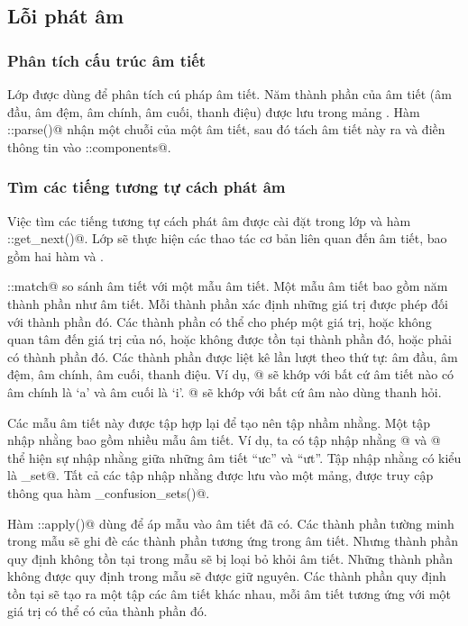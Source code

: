 \documentclass[a4paper,oneside,14pt]{extbook} %
\begin{document}
\subsection{Lỗi phát âm}
\label{sec:impl:phonetic-error}
\subsubsection{Phân tích cấu trúc âm tiết}

Lớp \verb@Syllable@ được dùng để phân tích cú pháp âm tiết. Năm thành
phần của âm tiết (âm đầu, âm đệm, âm chính, âm cuối, thanh điệu) được
lưu trong mảng \verb@components@. Hàm \verb@Syllable::parse()@ nhận
một chuỗi của một âm tiết, sau đó tách âm tiết này ra và điền thông
tin vào \verb@Syllable::components@.

\subsubsection{Tìm các tiếng tương tự cách phát âm}

Việc tìm các tiếng tương tự cách phát âm được cài đặt trong lớp
\verb@Syllable@ và hàm
\verb@FuzzyWordState::get_next()@. Lớp
\verb@Syllable@ sẽ thực hiện các thao tác cơ bản liên quan đến âm
tiết, bao gồm hai hàm \verb@match@ và \verb@apply@.

\verb@Syllable::match@ so sánh âm tiết với một mẫu âm tiết. Một mẫu
âm tiết bao gồm năm thành phần như âm tiết. Mỗi thành phần xác định
những giá trị được phép đối với thành phần đó. Các thành phần có thể
cho phép một giá trị, hoặc không quan tâm đến giá trị của nó, hoặc
không được tồn tại thành phần đó, hoặc phải có thành phần đó. Các
thành phần được liệt kê lần lượt theo thứ tự: âm đầu, âm đệm, âm
chính, âm cuối, thanh điệu. Ví dụ, \verb@[?,?,a,i,?]@ sẽ
khớp với bất cứ âm tiết nào có âm chính là `a' và âm cuối là
`i'. \verb@[?,?,?,?,Hook]@ sẽ khớp với bất cứ âm nào dùng
thanh hỏi.

Các mẫu âm tiết này được tập hợp lại để tạo nên tập nhầm nhằng. Một
tập nhập nhằng bao gồm nhiều mẫu âm tiết. Ví dụ, ta có tập nhập nhằng
\verb@[?,?,ư,t,?]@ và \verb@[?,?,ư,c,?]@ thể
hiện sự nhập nhằng giữa những âm tiết ``ưc'' và ``ưt''. Tập nhập nhằng
có kiểu là \verb@confusion_set@. Tất cả các tập nhập nhằng được lưu
vào một mảng, được truy cập thông qua hàm \verb@get_confusion_sets()@.

Hàm \verb@Syllable::apply()@ dùng để áp mẫu vào âm tiết đã có. Các
thành phần tường minh trong mẫu sẽ ghi đè các thành phần tương ứng
trong âm tiết. Nhưng thành phần quy định không tồn tại trong mẫu sẽ bị
loại bỏ khỏi âm tiết. Những thành phần không được quy định trong mẫu
sẽ được giữ nguyên. Các thành phần quy định tồn tại sẽ tạo ra một tập
các âm tiết khác nhau, mỗi âm tiết tương ứng với một giá trị có thể có
của thành phần đó.
\end{document}
